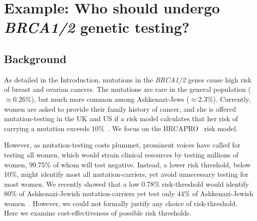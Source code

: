 \documentclass[AMA,STIX1COL]{WileyNJD-v2}
\begin{document}
%


\section{Example: Who should undergo \textit{BRCA1/2} genetic testing?}
\label{sec:BRCA}

\subsection{Background}
\label{sec:BRCAbackground}

As detailed in the Introduction, mutations in the \textit{BRCA1/2} genes cause high risk of breast and ovarian cancers.  The mutations are rare in the general population ($\approx0.26\%$), but much more common among Ashkenazi-Jews ($\approx2.3\%$).  Currently, women are asked to provide their family history of cancer, and she is offered mutation-testing in the UK and US if a risk model calculates that her risk of carrying a mutation exceeds 10\%~\citep{NICE2017}.  We focus on the BRCAPRO~\citep{Parmigiani1998} risk model.  

However, as mutation-testing costs plummet, prominent voices have called for testing all women, which would strain clinical resources by testing millions of women, 99.75\% of whom will test negative.  Instead, a lower risk threshold, below 10\%, might identify most all mutation-carriers, yet avoid unnecessary testing for most women.  We recently showed that a low 0.78\% risk-threshold would identify 80\% of Ashkenazi-Jewish mutation-carriers yet test only 44\% of Ashkenazi-Jewish women~\citep{Best2019}.  However, we could not formally justify any choice of risk-threshold.  Here we examine cost-effectiveness of possible risk thresholds.
\end{document}
